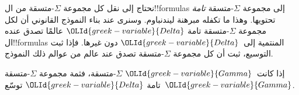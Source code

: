 \documentclass[../../../include/open-logic-section]{subfiles}
\begin{document}


نحتاج إلى نقل كل مجموعة $\Sigma$-متسقة من ال!!{formula}s إلى مجموعة
$\Sigma$-متسقة \emph{تامة} تحتويها. وهذا ما تكفله مبرهنة ليندنباوم.
وسنرى عند بناء النموذج القانوني أن لكل مجموعة $\Sigma$-متسقة تامة
${\OLId{greek-variable}{Delta}}$ عالمًا تصدق عنده ال!!{formula}s المنتمية إلى~${\OLId{greek-variable}{Delta}}$ دون غيرها.
فإذا ثبت التوسيع، ثبت أن كل مجموعة $\Sigma$-متسقة
تصدق عند عالم من عوالم ذلك النموذج.

\begin{thm}
  إذا كانت~${\OLId{greek-variable}{Gamma}}$ $\Sigma$-متسقة، فثمة مجموعة $\Sigma$-متسقة تامة
  ${\OLId{greek-variable}{Delta}}$ توسّع~${\OLId{greek-variable}{Gamma}}$.
\end{thm}
\end{document}
